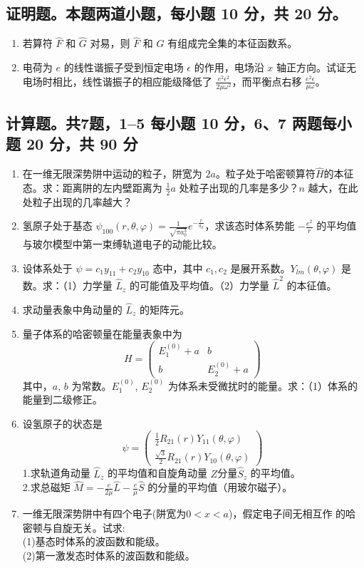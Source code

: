 \subsection{证明题。本题两道小题，每小题 10 分，共 20 分。}
\begin{enumerate}
    \item 若算符 $\hat{F}$ 和 $\hat{G}$ 对易，则 $\hat{F}$ 和 $\hat{G}$ 有组成完全集的本征函数系。
    \item 电荷为 $e$ 的线性谐振子受到恒定电场 $\epsilon$ 的作用，电场沿 $x$ 轴正方向。试证无电场时相比，线性谐振子的相应能级降低了 $\frac{e^2 \epsilon^2}{2\mu \omega^2}$，而平衡点右移 $\frac{e^2 \epsilon}{\mu \omega}$。
\end{enumerate}
\subsection{计算题。共7题，1--5 每小题 10 分，6、7 两题每小题 20 分，共 90 分}
\begin{enumerate}
    \item 在一维无限深势阱中运动的粒子，阱宽为 $2a$。粒子处于哈密顿算符$\hat H$的本征态。求：距离阱的左内壁距离为 $\frac{1}{2}a$ 处粒子出现的几率是多少？$n$ 越大，在此处粒子出现的几率越大？
    \item 氢原子处于基态 $\psi_{100} (r, \theta, \varphi) = \frac{1}{\sqrt{\pi a_0^3}} e^{- \frac{r}{a_0}}$，求该态时体系势能 $-\frac{e^2}{r}$ 的平均值与玻尔模型中第一束缚轨道电子的动能比较。
    \item 设体系处于 $\psi = c_1 y_{11} + c_2 y_{10}$ 态中，其中 $c_1, c_2$ 是展开系数。$Y_{lm}(\theta, \varphi)$ 是数。求：（1）力学量 $\hat L_z$ 的可能值及平均值。（2）力学量 $\hat L^2$ 的本征值。
    \item 求动量表象中角动量的 $\hat{L}_z$ 的矩阵元。
    \item 量子体系的哈密顿量在能量表象中为
    \[
    H = 
    \begin{pmatrix}
    E_1^{(0)} + a & b \\
    b & E_2^{(0)} + a
    \end{pmatrix}~
    \]
其中，$a$, $b$ 为常数。$E_1^{(0)}$, $E_2^{(0)}$ 为体系未受微扰时的能量。求：（1）体系的能量到二级修正。
    \item 设氢原子的状态是
\[
\psi = \begin{pmatrix}
\frac{1}{2} R_{21}(r)Y_{11}(\theta, \varphi) \\
\frac{\sqrt{3}}{2} R_{21}(r)Y_{10}(\theta, \varphi)
\end{pmatrix}~
\]
1.求轨道角动量 $\hat{L}_z$ 的平均值和自旋角动量 $Z$分量$\hat{S}_z$ 的平均值。\\
2.求总磁矩 $\hat{M} = -\frac{e}{2\mu}\hat{L} - \frac{e}{\mu} \hat{S}$ 的分量的平均值（用玻尔磁子）。
    \item 一维无限深势阱中有四个电子(阱宽为$0<x<a$)，假定电子间无相互作
的哈密顿与自旋无关。试求:\\
(1)基态时体系的波函数和能级。\\
(2)第一激发态时体系的波函数和能级。
\end{enumerate}